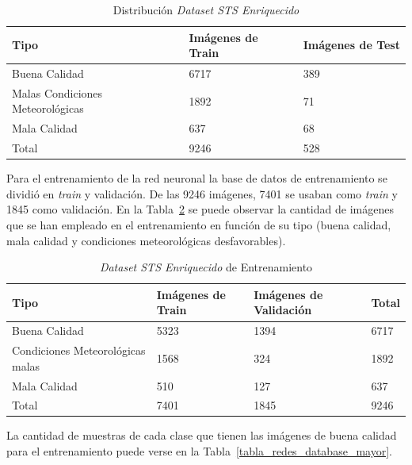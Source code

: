 \begin{table}[H] 
\begin{center}
\begin{tabular}{|l|l|l|}
\hline
Tipo & Imágenes de Train & Imágenes de Test  \\ 
\hline \hline
Buena Calidad & 6717 & 389  \\ \hline
Malas Condiciones Meteorológicas & 1892 & 71 \\ \hline
Mala Calidad  & 637 & 68  \\ \hline
Total & 9246 & 528 \\ \hline
\end{tabular}
\caption{Distribución \textit{Dataset STS Enriquecido}}
\label{tabla_distribucion_base_datos}
\end{center}
\end{table}

Para el entrenamiento de la red neuronal la base de datos de entrenamiento se dividió en \textit{train} y validación. De las 9246 imágenes, 7401 se usaban como \textit{train} y 1845 como validación. En la Tabla~\ref{base_datos_final_train} se puede observar la cantidad de imágenes que se han empleado en el entrenamiento en función de su tipo (buena calidad, mala calidad y condiciones meteorológicas desfavorables).

\begin{table}[H]
\begin{center}
\begin{tabular}{|l|l|l|l|}
\hline
Tipo  & Imágenes de Train & Imágenes de Validación & Total \\
\hline \hline
Buena Calidad & 5323 &  1394 & 6717 \\ \hline
Condiciones Meteorológicas malas & 1568 & 324 & 1892 \\ \hline
Mala Calidad & 510 & 127 & 637 \\ \hline
Total & 7401 & 1845 & 9246 \\ \hline
\end{tabular}
\caption{\textit{Dataset STS Enriquecido} de Entrenamiento}
\label{base_datos_final_train}
\end{center}
\end{table}

La cantidad de muestras de cada clase que tienen las imágenes de buena calidad para el entrenamiento puede verse en la Tabla~\ref{tabla_redes_database_mayor}. 

